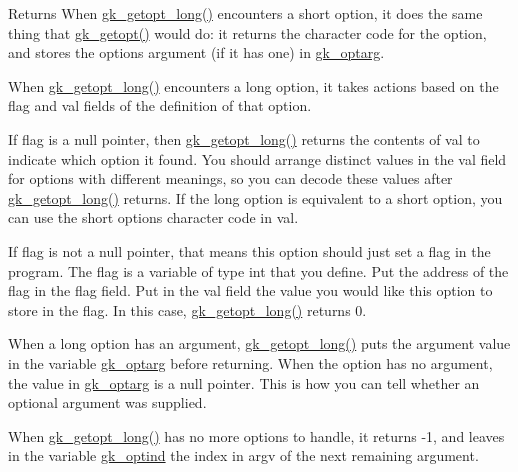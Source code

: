 \begin{DoxyReturn}{Returns}
When \hyperlink{a00038_a1c3b8d80bd9620dc66f24d4854c0f6d3}{gk\+\_\+getopt\+\_\+long()} encounters a short option, it does the same thing that \hyperlink{a00038_af82cf3b0fb9ec4411a987f02df3b2e47}{gk\+\_\+getopt()} would do\+: it returns the character code for the option, and stores the options argument (if it has one) in \hyperlink{a00038_a7e251e946564d7de41aa8f602b94e74e}{gk\+\_\+optarg}.

When \hyperlink{a00038_a1c3b8d80bd9620dc66f24d4854c0f6d3}{gk\+\_\+getopt\+\_\+long()} encounters a long option, it takes actions based on the flag and val fields of the definition of that option.

If flag is a null pointer, then \hyperlink{a00038_a1c3b8d80bd9620dc66f24d4854c0f6d3}{gk\+\_\+getopt\+\_\+long()} returns the contents of val to indicate which option it found. You should arrange distinct values in the val field for options with different meanings, so you can decode these values after \hyperlink{a00038_a1c3b8d80bd9620dc66f24d4854c0f6d3}{gk\+\_\+getopt\+\_\+long()} returns. If the long option is equivalent to a short option, you can use the short option\textquotesingle{}s character code in val.

If flag is not a null pointer, that means this option should just set a flag in the program. The flag is a variable of type int that you define. Put the address of the flag in the flag field. Put in the val field the value you would like this option to store in the flag. In this case, \hyperlink{a00038_a1c3b8d80bd9620dc66f24d4854c0f6d3}{gk\+\_\+getopt\+\_\+long()} returns 0.

When a long option has an argument, \hyperlink{a00038_a1c3b8d80bd9620dc66f24d4854c0f6d3}{gk\+\_\+getopt\+\_\+long()} puts the argument value in the variable \hyperlink{a00038_a7e251e946564d7de41aa8f602b94e74e}{gk\+\_\+optarg} before returning. When the option has no argument, the value in \hyperlink{a00038_a7e251e946564d7de41aa8f602b94e74e}{gk\+\_\+optarg} is a null pointer. This is how you can tell whether an optional argument was supplied.

When \hyperlink{a00038_a1c3b8d80bd9620dc66f24d4854c0f6d3}{gk\+\_\+getopt\+\_\+long()} has no more options to handle, it returns -\/1, and leaves in the variable \hyperlink{a00038_ab70fc0e7e22192b687bd0d377bf61e32}{gk\+\_\+optind} the index in argv of the next remaining argument. 
\end{DoxyReturn}
\mbox{\label{a00038_abb224612ca0aae2d39bd87f6146bd67d}} 
